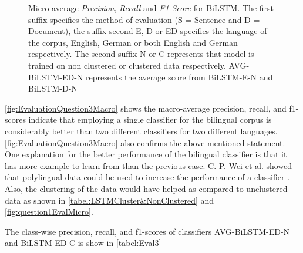 \begin{figure}[!ht]
  \captionsetup{justification=justified,margin=1cm}
    \caption{Micro-average \textit{Precision}, \textit{Recall} and \textit{F1-Score} for \gls{BiLSTM}. The first suffix specifies the method of evaluation (S = Sentence and D = Document), the suffix second E, D or ED specifies the language of the corpus, English, German or both English and German respectively. The second suffix N or C represents that model is trained on non clustered or clustered data respectively. AVG-BiLSTM-ED-N represents the average score from BiLSTM-E-N and BiLSTM-D-N}
    \label{fig:EvaluationQuestion3Micro}
\end{figure}


\ref{fig:EvaluationQuestion3Macro} shows the macro-average precision, recall, and f1-scores indicate that employing a single classifier for the bilingual corpus is considerably better than two different classifiers for two different languages. \ref{fig:EvaluationQuestion3Macro} also confirms the above mentioned statement.
One explanation for the better performance of the bilingual classifier is that it has more example to learn from than the previous case. C.-P. Wei et al. showed that polylingual data could be used to increase the performance of a classifier \cite{Wei:2014:EPD:2566999.2567111}. Also, the clustering of the data would have helped as compared to unclustered data as shown in \ref{tabel:LSTMCluster&NonClustered} and  \ref{fig:question1EvalMicro}. 


The class-wise precision, recall, and f1-scores of classifiers AVG-BiLSTM-ED-N and BiLSTM-ED-C is show in \ref{tabel:Eval3}

